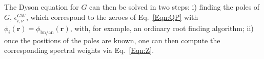 \documentclass[aps,prb,reprint,superscriptaddress]{revtex4-1}
\newcommand{\br}{\boldsymbol{r}}
\newcommand{\bn}{\text{bn}}
\newcommand{\an}{\text{an}}
\begin{document}
The Dyson equation for $G$ can then be solved in two steps: i) finding the poles of $G$, $\epsilon^{GW}_{i,\nu}$, which correspond to the zeroes of Eq.~\eqref{Eqn:QP} with $\phi_i(\br)=\phi_{\bn/\an}(\br)$, with, for example, an ordinary root finding algorithm; ii) once the positions of the poles are known, one can then compute the corresponding spectral weights via Eq.~\eqref{Eqn:Z}.






\end{document}

